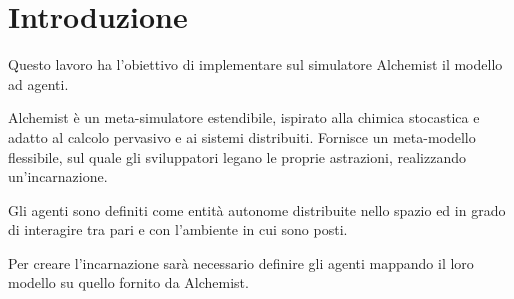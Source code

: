 \documentclass[12pt,a4paper,openright,twoside]{report}
\begin{document}
\begin{titlepage}

\thispagestyle{empty}

\topmargin=6.5cm

\raggedleft

\large

\em


\newpage

\clearpage{\pagestyle{empty}\cleardoublepage}
\end{titlepage}

\chapter*{Introduzione} %


Questo lavoro ha l'obiettivo di implementare sul simulatore Alchemist il modello ad agenti.

Alchemist \`e un meta-simulatore estendibile, ispirato alla chimica stocastica e adatto al calcolo pervasivo e ai sistemi distribuiti. Fornisce un meta-modello flessibile, sul quale gli sviluppatori legano le proprie astrazioni, realizzando un'incarnazione.

Gli agenti sono definiti come entit\`a autonome distribuite nello spazio ed in grado di interagire tra pari e con l'ambiente in cui sono posti.

Per creare l'incarnazione sar\`a necessario definire gli agenti mappando il loro modello su quello fornito da Alchemist.


\clearpage{\pagestyle{empty}\cleardoublepage}
\end{document}
